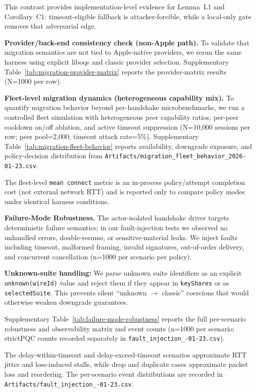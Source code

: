 \documentclass[10pt,journal,compsoc]{IEEEtran}
\newcommand{\artifactdate}{2026-01-23}
\begin{document}
This contrast provides implementation-level evidence for Lemma~L1 and
Corollary~C1: timeout-eligible fallback is attacker-forcible, while a
local-only gate removes that adversarial edge.

\textbf{Provider/back-end consistency check (non-Apple path).}
To validate that migration semantics are not tied to Apple-native
providers, we rerun the same harness using explicit liboqs and classic
provider selection. Supplementary Table~\ref{tab:migration-provider-matrix}
reports the provider-matrix results (N=1000 per row).

\textbf{Fleet-level migration dynamics (heterogeneous capability mix).}
To quantify migration behavior beyond per-handshake microbenchmarks, we
run a controlled fleet simulation with heterogeneous peer capability
ratios, per-peer cooldown on/off ablation, and active timeout
suppression (N=10{,}000 sessions per row; peer pool=2{,}000; timeout
attack rate=5\%). Supplementary Table~\ref{tab:migration-fleet-behavior}
reports availability, downgrade exposure, and policy-decision
distribution from
\texttt{Artifacts/\allowbreak migration\_fleet\_behavior\_\artifactdate.csv}.

The fleet-level \texttt{mean connect} metric is an in-process
policy/attempt completion cost (not external network RTT) and is reported
only to compare policy modes under identical harness conditions.

\textbf{Failure-Mode Robustness.}
The actor-isolated handshake driver targets deterministic failure semantics; in our fault-injection tests we observed no unhandled errors, double-resume, or sensitive-material leaks. We inject faults including timeout, malformed framing, invalid signatures, out-of-order delivery, and concurrent cancellation (n=1000 per scenario per policy).

\textbf{Unknown-suite handling:} We parse unknown suite identifiers as an
explicit \texttt{unknown(wireId)} value and reject them if they appear in
\texttt{keyShares} or as \texttt{selectedSuite}. This prevents silent
``unknown $\rightarrow$ classic'' coercions that would otherwise weaken
downgrade guarantees.

Supplementary Table~\ref{tab:failure-mode-robustness} reports the full
per-scenario robustness and observability matrix and event counts (n=1000
per scenario; strictPQC counts recorded separately in
\texttt{fault\_injection\_\allowbreak \artifactdate.csv}).

The delay-within-timeout and delay-exceed-timeout scenarios approximate
RTT jitter and loss-induced stalls, while drop and duplicate cases
approximate packet loss and reordering. The per-scenario event
distributions are recorded in \texttt{Artifacts/\allowbreak fault\_injection\_\allowbreak \artifactdate.csv}.
\end{document}
